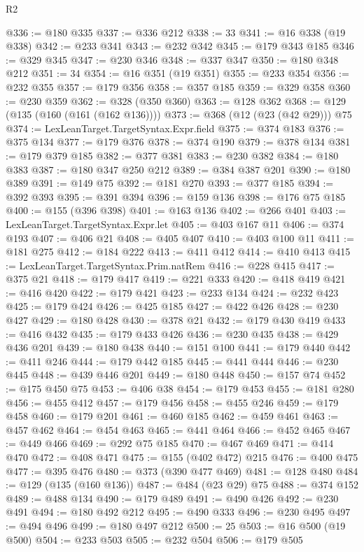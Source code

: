\begin{lexlean}{R2}
\begin{coremodule}
@336 := @180 @335
@337 := @336 @212
@338 := 33
@341 := @16 @338 (@19 @338)
@342 := @233 @341
@343 := @232 @342
@345 := @179 @343 @185
@346 := @329 @345
@347 := @230 @346
@348 := @337 @347
@350 := @180 @348 @212
@351 := 34
@354 := @16 @351 (@19 @351)
@355 := @233 @354
@356 := @232 @355
@357 := @179 @356
@358 := @357 @185
@359 := @329 @358
@360 := @230 @359
@362 := @328 (@350 @360)
@363 := @128 @362
@368 := @129 (@135 (@160 (@161 (@162 @136))))
@373 := @368 (@12 (@23 (@42 @29))) @75
@374 := LexLeanTarget.TargetSyntax.Expr.field
@375 := @374 @183
@376 := @375 @134
@377 := @179 @376
@378 := @374 @190
@379 := @378 @134
@381 := @179 @379 @185
@382 := @377 @381
@383 := @230 @382
@384 := @180 @383
@387 := @180 @347 @250 @212
@389 := @384 @387 @201
@390 := @180 @389
@391 := @149 @75
@392 := @181 @270
@393 := @377 @185
@394 := @392 @393
@395 := @391 @394
@396 := @159 @136
@398 := @176 @75 @185
@400 := @155 (@396 @398)
@401 := @163 @136
@402 := @266 @401
@403 := LexLeanTarget.TargetSyntax.Expr.let
@405 := @403 @167 @11
@406 := @374 @193
@407 := @406 @21
@408 := @405 @407
@410 := @403 @100 @11
@411 := @181 @275
@412 := @184 @222
@413 := @411 @412
@414 := @410 @413
@415 := LexLeanTarget.TargetSyntax.Prim.natRem
@416 := @228 @415
@417 := @375 @21
@418 := @179 @417
@419 := @221 @333
@420 := @418 @419
@421 := @416 @420
@422 := @179 @421
@423 := @233 @134
@424 := @232 @423
@425 := @179 @424
@426 := @425 @185
@427 := @422 @426
@428 := @230 @427
@429 := @180 @428
@430 := @378 @21
@432 := @179 @430 @419
@433 := @416 @432
@435 := @179 @433 @426
@436 := @230 @435
@438 := @429 @436 @201
@439 := @180 @438
@440 := @151 @100
@441 := @179 @440
@442 := @411 @246
@444 := @179 @442 @185
@445 := @441 @444
@446 := @230 @445
@448 := @439 @446 @201
@449 := @180 @448
@450 := @157 @74
@452 := @175 @450 @75
@453 := @406 @38
@454 := @179 @453
@455 := @181 @280
@456 := @455 @412
@457 := @179 @456
@458 := @455 @246
@459 := @179 @458
@460 := @179 @201
@461 := @460 @185
@462 := @459 @461
@463 := @457 @462
@464 := @454 @463
@465 := @441 @464
@466 := @452 @465
@467 := @449 @466
@469 := @292 @75 @185
@470 := @467 @469
@471 := @414 @470
@472 := @408 @471
@475 := @155 (@402 @472) @215
@476 := @400 @475
@477 := @395 @476
@480 := @373 (@390 @477 @469)
@481 := @128 @480
@484 := @129 (@135 (@160 @136))
@487 := @484 (@23 @29) @75
@488 := @374 @152
@489 := @488 @134
@490 := @179 @489
@491 := @490 @426
@492 := @230 @491
@494 := @180 @492 @212
@495 := @490 @333
@496 := @230 @495
@497 := @494 @496
@499 := @180 @497 @212
@500 := 25
@503 := @16 @500 (@19 @500)
@504 := @233 @503
@505 := @232 @504
@506 := @179 @505

\end{coremodule}
\end{lexlean}
